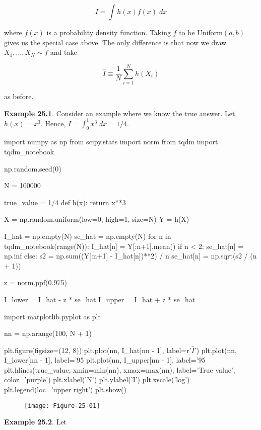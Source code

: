 \[ I = \int h(x) f(x) \; dx \]

where \(f(x)\) is a probability density function. Taking \(f\) to be
\(\text{Uniform}(a, b)\) gives us the special case above. The only
difference is that now we draw \(X_{1}, \dots, X_N \sim f\) and take

\[ \hat{I} \equiv \frac{1}{N} \sum_{i=1}^N h(X_{i}) \]

as before.

\textbf{Example 25.1}. Consider an example where we know the
true answer. Let \(h(x) = x^{3}\). Hence, \(I = \int_{0}^{1} x^{3}\;dx = 1/4\).

\begin{python}
import numpy as np
from scipy.stats import norm
from tqdm import tqdm_{n}otebook

np.random.seed(0)

N = 100000

true_value = 1/4
def h(x):
    return x**3

X = np.random.uniform(low=0, high=1, size=N)
Y = h(X)

I_hat = np.empty(N)
se_hat = np.empty(N)
for n in tqdm_{n}otebook(range(N)):
    I_hat[n] = Y[:n+1].mean()
    if n < 2:
        se_hat[n] = np.inf
    else:
        s2 = np.sum((Y[:n+1] - I_hat[n])**2) / n
        se_hat[n] = np.sqrt(s2 / (n + 1))

        
z = norm.ppf(0.975)

I_lower = I_hat - z * se_hat
I_upper = I_hat + z * se_hat
\end{python}

\begin{python}
import matplotlib.pyplot as plt

nn = np.arange(100, N + 1)

plt.figure(figsize=(12, 8))
plt.plot(nn, I_hat[nn - 1], label=r'$\hat{I}$')
plt.plot(nn, I_lower[nn - 1], label='95%
plt.plot(nn, I_upper[nn - 1], label='95%
plt.hlines(true_value, xmin=min(nn), xmax=max(nn), label='True value', color='purple')
plt.xlabel('N')
plt.ylabel('I')
plt.xscale('log')
plt.legend(loc='upper right')
plt.show()
\end{python}

\begin{figure}[H]
\centering
\texttt{[image: Figure-25-01]}
\end{figure}

\textbf{Example 25.2}. Let

